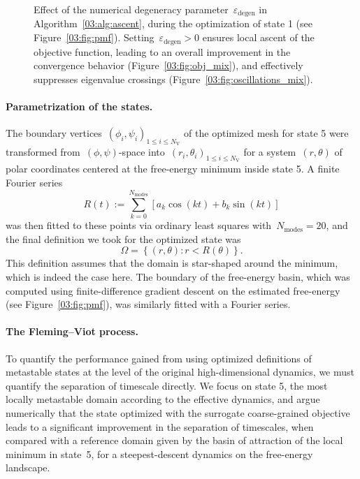 \begin{figure}
    \caption[]{Effect of the numerical degeneracy parameter~$\varepsilon_{\mathrm{degen}}$ in Algorithm~\ref{03:alg:ascent}, during the optimization of state 1 (see Figure~\ref{03:fig:pmf}). Setting~$\varepsilon_{\mathrm{degen}}>0$ ensures local ascent of the objective function, leading to an overall improvement in the convergence behavior (Figure~\ref{03:fig:obj_mix}), and effectively suppresses eigenvalue crossings (Figure~\ref{03:fig:oscillations_mix}).}
    \label{03:fig:oscillations}
\end{figure}

\paragraph{Parametrization of the states.}
The boundary vertices~$(\phi_i,\psi_i)_{1\leq i\leq N_{\mathrm{V}}}$ of the optimized mesh for state 5 were transformed from~$(\phi,\psi)$-space into~$(r_i,\theta_i)_{1\leq i\leq N_{\mathrm{V}}}$ for a system~$(r,\theta)$ of polar coordinates centered at the free-energy minimum inside state 5. A finite Fourier series
\begin{equation}
    R(t):=\sum_{k=0}^{N_{\mathrm{modes}}}\left[a_k \cos(kt) + b_k\sin(kt)\right]
\end{equation}
was then fitted to these points via ordinary least squares with~$N_{\mathrm{modes}}=20$, and the final definition we took for the optimized state was
\begin{equation}
    \Omega =\left\{(r,\theta):r<R(\theta)\right\}.
\end{equation}
This definition assumes that the domain is star-shaped around the minimum, which is indeed the case here.
The boundary of the free-energy basin, which was computed using finite-difference gradient descent on the estimated free-energy (see Figure~\ref{03:fig:pmf}), was similarly fitted with a Fourier series.

\paragraph{The Fleming--Viot process.}
To quantify the performance gained from using optimized definitions of metastable states at the level of the original high-dimensional dynamics, we must quantify the separation of timescale directly.
We focus on state 5, the most locally metastable domain according to the effective dynamics, and argue numerically that the state optimized with the surrogate coarse-grained objective leads to a significant improvement in the separation of timescales, when compared with a reference domain given by the basin of attraction of the local minimum in state~5, for a steepest-descent dynamics on the free-energy landscape.

